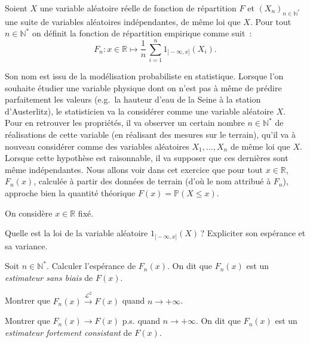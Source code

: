 Soient \(X\) une variable aléatoire réelle de fonction de répartition
\(F\) et \(\left(X_n\right)_{n\in\mathbb{N}^\ast}\) une suite de
variables aléatoires indépendantes, de même loi que \(X\). Pour tout
\(n\in\mathbb{N}^\ast\) on définit la fonction de répartition empirique
comme suit~:
\[F_n : x \in \mathbb{R}\mapsto \dfrac{1}{n}\,\sum_{i = 1}^n 1_{]-\infty,x]}(X_i).\]

Son nom est issu de la modélisation probabiliste en statistique. Lorsque
l'on souhaite étudier une variable physique dont on n'est pas à même de
prédire parfaitement les valeurs (e.g.~la hauteur d'eau de la Seine à la
station d'Austerlitz), le statisticien va la considérer comme une
variable aléatoire \(X\). Pour en retrouver les propriétés, il va
observer un certain nombre \(n\in\mathbb{N}^\ast\) de réalisations de
cette variable (en réalisant des mesures sur le terrain), qu'il va à
nouveau considérer comme des variables aléatoires \(X_1,\dots,X_n\) de
même loi que \(X\). Lorsque cette hypothèse est raisonnable, il va
supposer que ces dernières sont même indépendantes. Nous allons voir
dans cet exercice que pour tout \(x\in\mathbb{R}\), \(F_n(x)\), calculée
à partir des données de terrain (d'où le nom attribué à \(F_n\)),
approche bien la quantité théorique \(F(x) = \mathbb{P}(X\leq x)\).

On considère \(x\in\mathbb{R}\) fixé.

\label{IV-fdremp-loi}
Quelle est la loi de la variable aléatoire \(1_{]-\infty,x]}(X)\)\,?
Expliciter son espérance et sa variance.

\label{IV-fdremp-biais}
Soit \(n\in\mathbb{N}^\ast\). Calculer l'espérance de \(F_n(x)\). On dit
que \(F_n(x)\) est un \emph{estimateur sans biais} de
\(F(x)\).

\label{IV-fdremp-mse}
Montrer que \(F_n(x) \overset{\mathcal{L}^2}{\longrightarrow} F(x)\)
quand \(n\to+\infty\).

\label{IV-fdremp-ps}
Montrer que \(F_n(x) \to F(x)\) p.s. quand \(n\to+\infty\). On dit que
\(F_n(x)\) est un \emph{estimateur fortement consistant} de
\(F(x)\).

